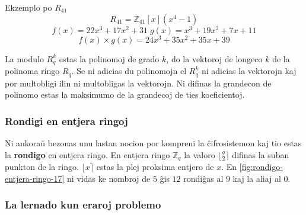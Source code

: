 \documentclass[utf8]{scrartcl}
\makeatletter
\renewenvironment{figure}[1][]{%
  \ifthenelse{\equal{#1}{}}{%
    \@float{figure}%
  }{%
    \@float{figure}[#1]%
  }%
  \centering%
}{%
\end@float\ignorespaces\ignorespacesafterend%
}
\makeatother
\begin{document}
Ekzemplo po $R_{41}$
\[
  R_{41} = \mathbb{Z}_{41}[x](x^4-1)
\]
\[
  f(x) = 22x^3 + 17x^2 + 31 \; g(x) = x^3 + 19x^2 + 7x + 11
\]
\[
  f(x) \times g(x) = 24x^3 + 35x^2 + 35x + 39
\]

La modulo $R_q^k$ estas la polinomoj de grado $k$, do la vektoroj de longeco
$k$ de la polinoma ringo $R_q$. Se ni adicias du polinomojn el $R_q^k$ ni
adicias la vektorojn kaj por multobligi ilin ni multobligas la vektorojn.  Ni
difinas la grandecon de polinomo estas la maksimumo de la grandecoj de ties
koeficientoj.

\subsubsection{Rondigi en entjera ringoj}

Ni ankoraŭ bezonas unu lastan nocion por kompreni la ĉifrosistemon kaj tio
estas la \textbf{rondigo} en entjera ringo. En entjera ringo $\mathbb{Z}_q$ la
valoro $\bigl\lfloor\frac{q}{2}\bigr\rceil$ difinas la suban punkton de la
ringo. $\bigl\lfloor x\bigr\rceil$ estas la plej proksima entjero de $x$. En
\figuro \ref{fig:rondigo-entjera-ringo-17} ni vidas ke nombroj de $5$ ĝis $12$
rondiĝas al 9 kaj la aliaj al $0$.
%
\begin{figure}
  \caption{Rondigo en entjera ringo -- en la supra duono ni rondigas al $0$,
    en la malsupra al $\bigl\lfloor\frac{q}{2}\bigr\rceil = 9$}
  \label{fig:rondigo-entjera-ringo-17}
\end{figure}

\subsubsection{La lernado kun eraroj problemo}
\end{document}
